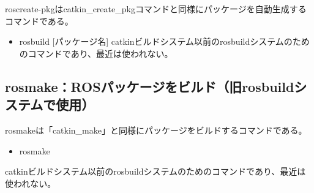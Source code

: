 roscreate-pkgはcatkin\_create\_pkgコマンドと同様にパッケージを自動生成するコマンドである。

\begin{itemize}
\item  rosbuild [パッケージ名]
catkinビルドシステム以前のrosbuildシステムのためのコマンドであり、最近は使われない。
\end{itemize}

\subsection{rosmake：ROSパッケージをビルド（旧rosbuildシステムで使用）}

rosmakeは「catkin\_make」と同様にパッケージをビルドするコマンドである。

\begin{itemize}
\item  rosmake
\end{itemize}
catkinビルドシステム以前のrosbuildシステムのためのコマンドであり、最近は使われない。





